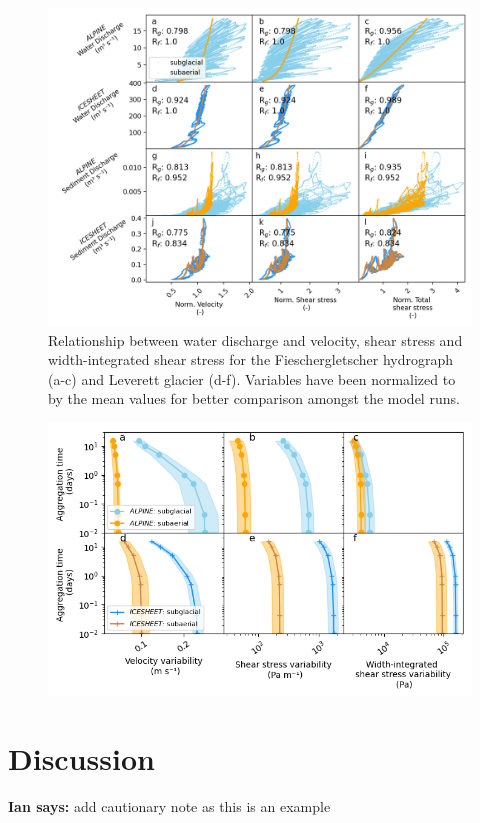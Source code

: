 \documentclass[draft]{agujournal2019}
\newcommand{\ian}[1]{{\textbf{\color{blue}Ian says:} \color{blue} #1} }
\begin{document}
\begin{center}
  \begin{figure}[H]
    \includegraphics[width=0.8\linewidth]{Qw_vari.png}
    \caption{Relationship between water discharge and velocity, shear stress and width-integrated shear stress for the Fieschergletscher hydrograph (a-c) and Leverett glacier (d-f). Variables have been normalized to by the mean values for better comparison amongst the model runs.} 
    \label{fig:Qw_vari}
  \end{figure}
\end{center}


\begin{center}
  \begin{figure}[H]
    \includegraphics[width=0.8\linewidth]{multi_run.png}
    \caption{} 
    \label{fig:multi_run}
  \end{figure}
\end{center}

\section{Discussion}
\ian{add cautionary note as this is an example}
\end{document}
